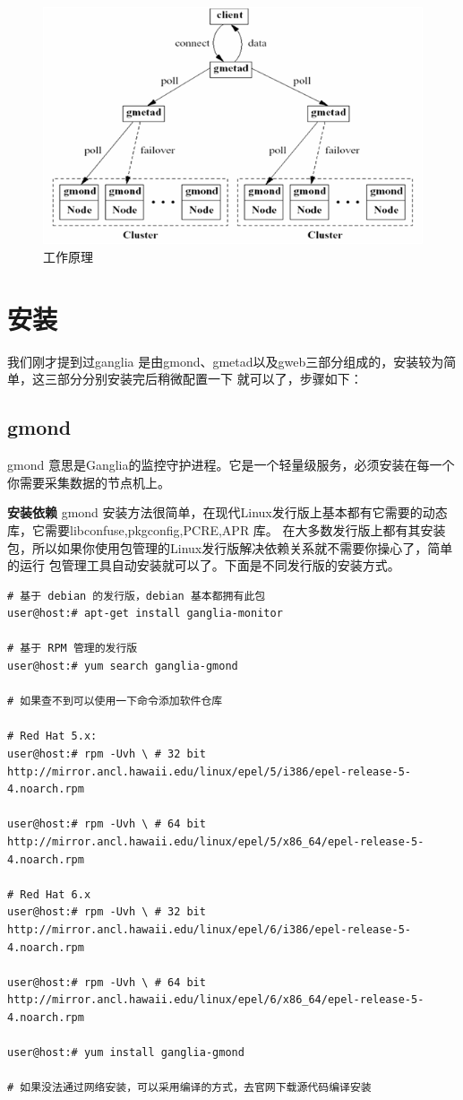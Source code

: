 \documentclass{article}
\begin{document}
\begin{figure}[H]
\centering\includegraphics[width=6in]{pics/01.png}
\caption{工作原理}\label{fig:1}
\end{figure}

\section{安装}
我们刚才提到过ganglia 是由gmond、gmetad以及gweb三部分组成的，安装较为简单，这三部分分别安装完后稍微配置一下
就可以了，步骤如下：

\subsection{gmond}
gmond 意思是Ganglia的监控守护进程。它是一个轻量级服务，必须安装在每一个你需要采集数据的节点机上。

\textbf{安装依赖}
gmond 安装方法很简单，在现代Linux发行版上基本都有它需要的动态库，它需要libconfuse,pkgconfig,PCRE,APR 库。
在大多数发行版上都有其安装包，所以如果你使用包管理的Linux发行版解决依赖关系就不需要你操心了，简单的运行
包管理工具自动安装就可以了。下面是不同发行版的安装方式。

\begin{verbatim}
# 基于 debian 的发行版，debian 基本都拥有此包
user@host:# apt-get install ganglia-monitor

# 基于 RPM 管理的发行版
user@host:# yum search ganglia-gmond

# 如果查不到可以使用一下命令添加软件仓库

# Red Hat 5.x:
user@host:# rpm -Uvh \ # 32 bit
http://mirror.ancl.hawaii.edu/linux/epel/5/i386/epel-release-5-4.noarch.rpm

user@host:# rpm -Uvh \ # 64 bit
http://mirror.ancl.hawaii.edu/linux/epel/5/x86_64/epel-release-5-4.noarch.rpm

# Red Hat 6.x
user@host:# rpm -Uvh \ # 32 bit
http://mirror.ancl.hawaii.edu/linux/epel/6/i386/epel-release-5-4.noarch.rpm

user@host:# rpm -Uvh \ # 64 bit
http://mirror.ancl.hawaii.edu/linux/epel/6/x86_64/epel-release-5-4.noarch.rpm

user@host:# yum install ganglia-gmond

# 如果没法通过网络安装，可以采用编译的方式，去官网下载源代码编译安装
\end{verbatim}
\end{document}
